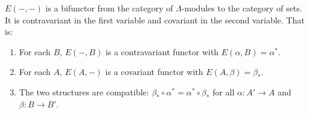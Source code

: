$E(-,-)$ is a bifunctor from the category of $\Lambda$-modules to the category of sets. It is contravariant in the first variable and covariant in the second variable. That is:
\begin{enumerate}
\item For each $B$, $E(-,B)$ is a contravariant functor with $E(\alpha,B) = \alpha^*$.
\item For each $A$, $E(A,-)$ is a covariant functor with $E(A,\beta) = \beta_*$.
\item The two structures are compatible: $\beta_* \circ \alpha^* = \alpha^* \circ \beta_*$ for all $\alpha: A' \to A$ and $\beta: B \to B'$.
\end{enumerate}
